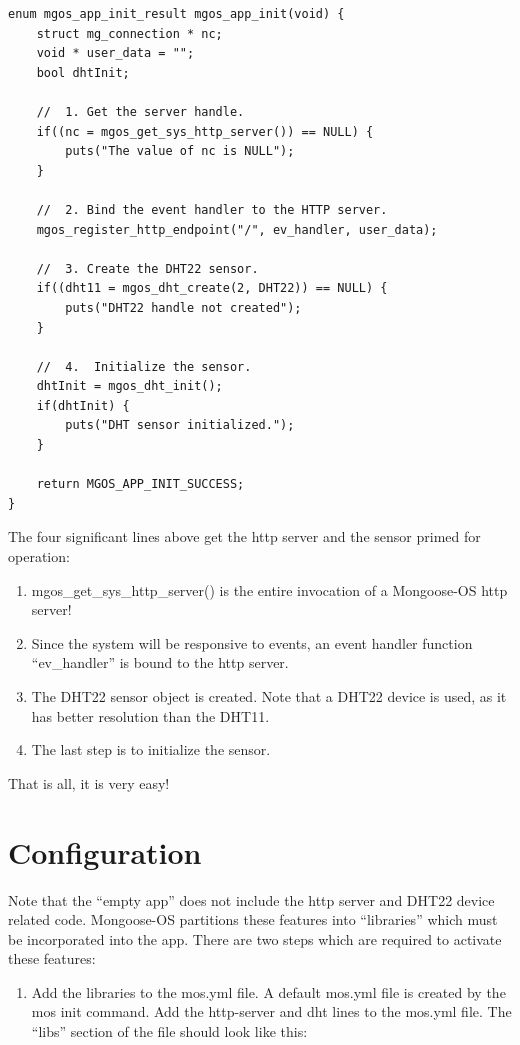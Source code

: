 \documentclass[letterpaper,]{book}
\providecommand{\tightlist}{%
  \setlength{\itemsep}{0pt}\setlength{\parskip}{0pt}}
\begin{document}
\begin{verbatim}
enum mgos_app_init_result mgos_app_init(void) {
    struct mg_connection * nc;
    void * user_data = "";
    bool dhtInit;

    //  1. Get the server handle.
    if((nc = mgos_get_sys_http_server()) == NULL) {
        puts("The value of nc is NULL");
    }

    //  2. Bind the event handler to the HTTP server.
    mgos_register_http_endpoint("/", ev_handler, user_data);

    //  3. Create the DHT22 sensor.
    if((dht11 = mgos_dht_create(2, DHT22)) == NULL) {
        puts("DHT22 handle not created");
    }

    //  4.  Initialize the sensor.
    dhtInit = mgos_dht_init();
    if(dhtInit) {
        puts("DHT sensor initialized.");
    }

    return MGOS_APP_INIT_SUCCESS;
}
\end{verbatim}

The four significant lines above get the http server and the sensor
primed for operation:

\begin{enumerate}
\def\labelenumi{\arabic{enumi}.}
\tightlist
\item
  mgos\_get\_sys\_http\_server() is the entire invocation of a
  Mongoose-OS http server!
\item
  Since the system will be responsive to events, an event handler
  function ``ev\_handler'' is bound to the http server.
\item
  The DHT22 sensor object is created. Note that a DHT22 device is used,
  as it has better resolution than the DHT11.
\item
  The last step is to initialize the sensor.
\end{enumerate}

That is all, it is very easy!

\section{Configuration}\label{configuration}

Note that the ``empty app'' does not include the http server and DHT22
device related code. Mongoose-OS partitions these features into
``libraries'' which must be incorporated into the app. There are two
steps which are required to activate these features:

\begin{enumerate}
\def\labelenumi{\arabic{enumi}.}
\tightlist
\item
  Add the libraries to the mos.yml file. A default mos.yml file is
  created by the mos init command. Add the http-server and dht lines to
  the mos.yml file. The ``libs'' section of the file should look like
  this:
\end{enumerate}
\end{document}
